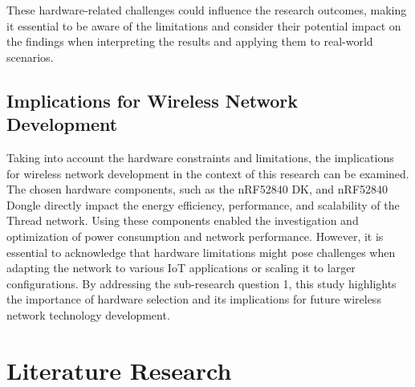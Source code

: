 These hardware-related challenges could influence the research outcomes, making it essential to be aware of the limitations and consider their potential impact on the findings when interpreting the results and applying them to real-world scenarios.

\subsection{Implications for Wireless Network Development}

Taking into account the hardware constraints and limitations, the implications for wireless network development in the context of this research can be examined. The chosen hardware components, such as the \gls{nRF}52840 \gls{DK}, and \gls{nRF}52840 Dongle directly impact the energy efficiency, performance, and scalability of the Thread network. Using these components enabled the investigation and optimization of power consumption and network performance. However, it is essential to acknowledge that hardware limitations might pose challenges when adapting the network to various \gls{IoT} applications or scaling it to larger configurations. By addressing the sub-research question 1, this study highlights the importance of hardware selection and its implications for future wireless network technology development.

\section{Literature Research}\label{sec:literature_research}

